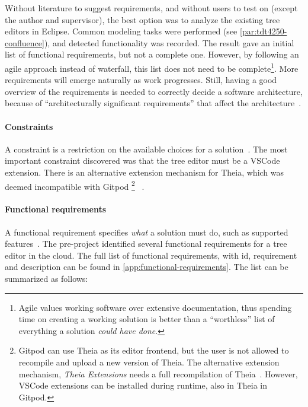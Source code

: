 Without literature to suggest requirements, and without users to test on (except the author and supervisor), the best option was to analyze the existing tree editors in \gls{Eclipse}.
Common modeling tasks were performed (see \cref{par:tdt4250-confluence}), and detected functionality was recorded.
The result gave an initial list of functional requirements, but not a complete one.
However, by following an agile approach instead of waterfall, this list does not need to be complete\footnote{Agile values working software over extensive documentation, thus spending time on creating a working solution is better than a ``worthless'' list of everything a solution \textit{could have done}.}.
More requirements will emerge naturally as work progresses.
Still, having a good overview of the requirements is needed to correctly decide a software architecture, because of ``architecturally significant requirements'' that affect the architecture~\cite[p.~291]{bassSoftwareArchitecturePractice2013}.

\paragraph{Constraints}
A constraint is a restriction on the available choices for a solution~\cite[p.~7]{wiegersSoftwareRequirements2013}.
The most important constraint discovered was that the tree editor must be a \gls{VSCode} extension.
There is an alternative extension mechanism for \gls{Theia}, which was deemed incompatible with \gls{Gitpod}%
\footnote{Gitpod can use Theia as its editor frontend, but the user is not allowed to recompile and upload a new version of Theia. The alternative extension mechanism, \textit{Theia Extensions} needs a full recompilation of Theia~\cite[p.~38]{rekstadModelingEnvironmentCloud2020}. However, VSCode extensions can be installed during runtime, also in Theia in Gitpod.}%
~\cite[p.~38]{rekstadModelingEnvironmentCloud2020}.


\paragraph{Functional requirements}
A functional requirement specifies \textit{what} a solution must do, such as supported features~\cite[p.~7]{wiegersSoftwareRequirements2013}.
The pre-project identified several functional requirements for a tree editor in the cloud.
The full list of functional requirements, with id, requirement and description can be found in \cref{app:functional-requirements}.
The list can be summarized as follows:

